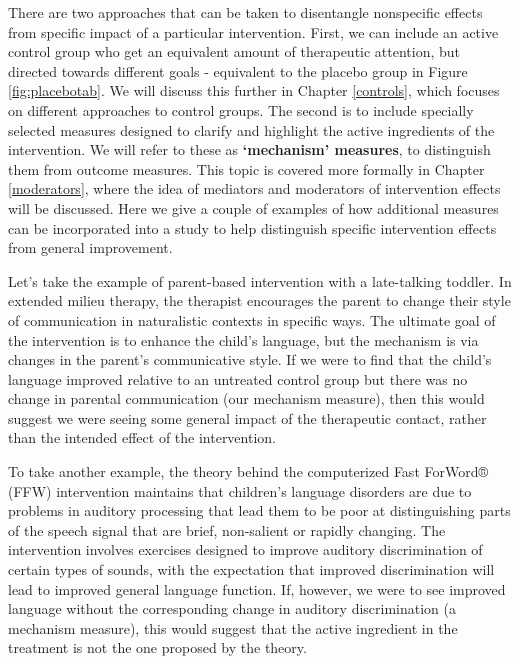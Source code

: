 \documentclass{krantz}
\begin{document}
There are two approaches that can be taken to disentangle nonspecific effects from specific impact of a particular intervention. First, we can include an active control group who get an equivalent amount of therapeutic attention, but directed towards different goals - equivalent to the placebo group in Figure \ref{fig:placebotab}. We will discuss this further in Chapter \ref{controls}, which focuses on different approaches to control groups. The second is to include specially selected measures designed to clarify and highlight the active ingredients of the intervention. We will refer to these as \textbf{`mechanism' measures}, to distinguish them from outcome measures. This topic is covered more formally in Chapter \ref{moderators}, where the idea of mediators and moderators of intervention effects will be discussed. Here we give a couple of examples of how additional measures can be incorporated into a study to help distinguish specific intervention effects from general improvement.

Let's take the example of parent-based intervention with a late-talking toddler. In extended milieu therapy, the therapist encourages the parent to change their style of communication in naturalistic contexts in specific ways. The ultimate goal of the intervention is to enhance the child's language, but the mechanism is via changes in the parent's communicative style. If we were to find that the child's language improved relative to an untreated control group but there was no change in parental communication (our mechanism measure), then this would suggest we were seeing some general impact of the therapeutic contact, rather than the intended effect of the intervention.

To take another example, the theory behind the computerized Fast ForWord® (FFW) intervention maintains that children's language disorders are due to problems in auditory processing that lead them to be poor at distinguishing parts of the speech signal that are brief, non-salient or rapidly changing. The intervention involves exercises designed to improve auditory discrimination of certain types of sounds, with the expectation that improved discrimination will lead to improved general language function. If, however, we were to see improved language without the corresponding change in auditory discrimination (a mechanism measure), this would suggest that the active ingredient in the treatment is not the one proposed by the theory. 
\end{document}
